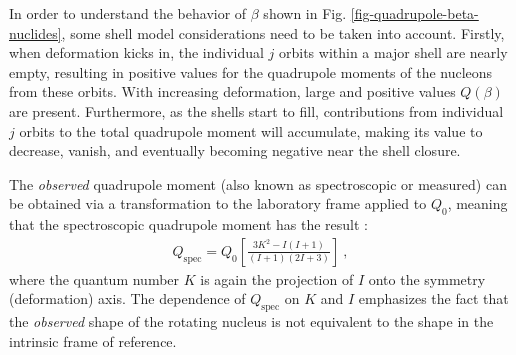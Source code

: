 In order to understand the behavior of $\beta$ shown in Fig. \ref{fig-quadrupole-beta-nuclides}, some shell model considerations need to be taken into account. Firstly, when deformation kicks in, the individual $j$ orbits within a major shell are nearly empty, resulting in positive values for the quadrupole moments of the nucleons from these orbits. With increasing deformation, large and positive values $Q(\beta)$ are present. Furthermore, as the shells start to fill, contributions from individual $j$ orbits to the total quadrupole moment will accumulate, making its value to decrease, vanish, and eventually becoming negative near the shell closure.

The \emph{observed} quadrupole moment (also known as spectroscopic or measured) can be obtained via a transformation to the laboratory frame applied to $Q_0$, meaning that the spectroscopic quadrupole moment has the result \cite{casten2000nuclear}:
\begin{align}
    Q_\text{spec}=Q_0\left[\frac{3K^2-I(I+1)}{(I+1)(2I+3)}\right]\ ,
    \label{quadrupole-moment-spectro}
\end{align}
where the quantum number $K$ is again the projection of $I$ onto the symmetry (deformation) axis. The dependence of $Q_\text{spec}$ on $K$ and $I$ emphasizes the fact that the \emph{observed} shape of the rotating nucleus is not equivalent to the shape in the intrinsic frame of reference.

